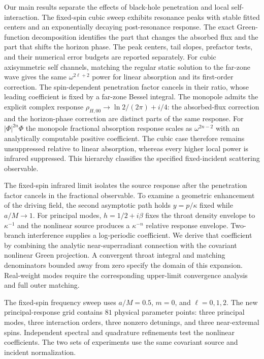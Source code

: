 \documentclass[aps,prd,twocolumn,10pt,nofootinbib,superscriptaddress,floatfix]{revtex4-2}
\begin{document}
Our main results separate the effects of black-hole penetration and local
self-interaction.  The fixed-spin cubic sweep exhibits resonance peaks
with stable fitted centers and an exponentially decaying post-resonance
response.  The exact Green-function decomposition identifies the part that
changes the absorbed flux and the part that shifts the horizon phase.
The peak centers, tail slopes, prefactor tests, and their numerical error
budgets are reported separately.  For cubic axisymmetric self channels, matching
the regular static solution to the far-zone wave gives the same
$\omega^{2\ell+2}$ power for linear absorption and its first-order
correction.  The spin-dependent penetration factor cancels in their ratio,
whose leading coefficient is fixed by a far-zone Bessel integral.
The monopole admits the explicit complex response
$\rho_{H,00}\to\ln2/(2\pi)+i/4$: the absorbed-flux correction and the
horizon-phase correction are distinct parts of the same response.
For $|\Phi|^{2n}\Phi$ the monopole fractional absorption response
scales as $\omega^{2n-2}$ with an analytically computable positive
coefficient.  The cubic case therefore remains unsuppressed relative to
linear absorption, whereas every higher local power is infrared
suppressed.  This hierarchy classifies the specified fixed-incident
scattering observable.

The fixed-spin infrared limit isolates the source response after the
penetration factor cancels in the fractional observable.  To examine a
geometric enhancement of the driving field, the second asymptotic path
holds $y=p/\kappa$ fixed while $a/M\to1$.
For principal modes, $h=1/2+i\beta$ fixes the throat density envelope to
$\kappa^{-1}$ and the nonlinear source produces a $\kappa^{-n}$ relative
response envelope.  Two-branch interference supplies a log-periodic
coefficient.  We derive that coefficient by combining the analytic
near-superradiant connection\cite{BredbergKerrCFT2010} with the covariant
nonlinear Green projection.  A convergent throat integral and matching
denominators bounded away from zero specify the domain of this expansion.
Real-weight modes require the corresponding upper-limit convergence
analysis and full outer matching.

The fixed-spin frequency sweep uses $a/M=0.5$, $m=0$, and $\ell=0,1,2$.
The new principal-response grid contains $81$ physical parameter points:
three principal modes, three interaction orders, three nonzero detunings,
and three near-extremal spins.  Independent spectral and quadrature
refinements test the nonlinear coefficients.  The two sets of experiments
use the same covariant source and incident normalization.
\end{document}

